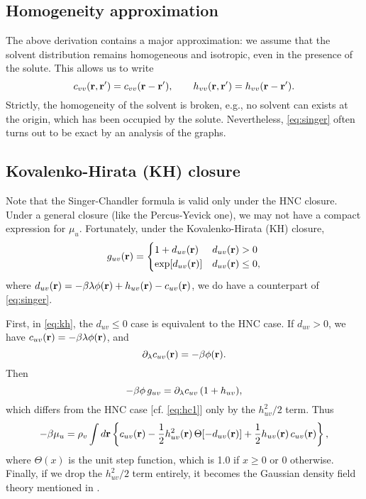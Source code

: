 \documentclass[12pt]{article}
\begin{document}
\subsection{Homogeneity approximation}

The above derivation contains a major approximation:
%
we assume that the solvent distribution
remains homogeneous and isotropic,
even in the presence of the solute.
%
This allows us to write
\[
  c_{vv}(\mathbf{r}, \mathbf{r}') = c_{vv}(\mathbf{r} - \mathbf{r}'),
  \qquad
  h_{vv}(\mathbf{r}, \mathbf{r}') = h_{vv}(\mathbf{r} - \mathbf{r}').
\]
Strictly, the homogeneity of the solvent is broken,
%
e.g., no solvent can exists at the origin,
which has been occupied by the solute.
%
Nevertheless,
\eqref{eq:singer}
often turns out to be exact
by an analysis of the graphs.



\subsection{Kovalenko-Hirata (KH) closure}

Note that the Singer-Chandler formula is valid
  only under the HNC closure.
Under a general closure (like the Percus-Yevick one),
  we may not have a compact expression for $\mu_u$.
Fortunately, under the Kovalenko-Hirata (KH) closure,
\begin{equation}
  g_{uv}(\mathbf{r}) =
  \begin{cases}
    1 + d_{uv}(\mathbf{r})
    & d_{uv}(\mathbf{r}) > 0
  \\
    \exp[ d_{uv}(\mathbf{r}) ]
    & d_{uv}(\mathbf{r}) \le 0,
  \end{cases}
  \label{eq:kh}
\end{equation}
where $d_{uv}(\mathbf{r}) = -\beta \lambda \phi(\mathbf{r}) + h_{uv}(\mathbf{r}) - c_{uv}(\mathbf{r})$,
we do have a counterpart of \eqref{eq:singer}.


First, in \eqref{eq:kh}, the $d_{uv} \le 0$ case is equivalent to the HNC case.
%
If $d_{uv} > 0$, we have $c_{uv}(\mathbf{r}) = -\beta \lambda \phi(\mathbf{r})$, and
\[
  \partial_\lambda c_{uv}(\mathbf{r}) = -\beta \phi(\mathbf{r}).
\]
Then
\[
  -\beta \phi \, g_{uv}
  = \partial_\lambda c_{uv} \, (1 + h_{uv}),
\]
which differs from the HNC case [cf. \eqref{eq:hc1}]
  only by the $h_{uv}^2/2$ term.
Thus
%
\begin{equation}
-\beta \mu_u
  =
  \rho_v \int d\mathbf{r}
  \left\{
    c_{uv}(\mathbf{r})
    - \frac{1}{2} h_{uv}^2(\mathbf{r}) \, \Theta[ -d_{uv}(\mathbf{r}) ]
    + \frac{1}{2} h_{uv}(\mathbf{r}) \, c_{uv}(\mathbf{r})
  \right\},
  \label{eq:singer-kh}
\end{equation}
%
where $\Theta(x)$ is the unit step function,
which is 1.0 if $x \ge 0$ or 0 otherwise.
%
Finally, if we drop the $h_{uv}^2/2$ term entirely,
it becomes the Gaussian density field theory mentioned in \cite{singer}.
\end{document}
